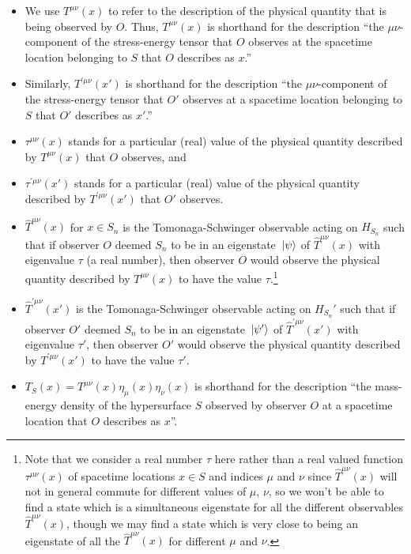 \begin{itemize}
\item We use $T^{\mu\nu}(x)$ to refer to the description of the physical quantity that is being observed by $O$. Thus, $T^{\mu\nu}(x)$ is shorthand for the description ``the $\mu\nu$-component of the stress-energy tensor that $O$ observes at the spacetime location belonging to $S$ that $O$ describes as  $x$.'' 
\item Similarly,  $T^{\prime\mu\nu}(x')$ is shorthand for the description ``the $\mu\nu$-component of the stress-energy tensor that $O'$ observes at a spacetime location  belonging to $S$ that $O'$ describes as $x'$.'' 
\item $\tau^{\mu\nu}(x)$ stands for a particular (real) value of the physical quantity described by $T^{\mu\nu}(x)$ that $O$ observes, and 
\item $\tau^{\prime\mu\nu}(x')$ stands for a particular (real) value of the physical quantity described by $T^{\prime\mu\nu}(x')$ that $O'$ observes.
\item $\hat{T}^{\mu\nu}(x)$ for $x\in S_n$ is the Tomonaga-Schwinger observable acting on $H_{S_n}$ such that if observer $O$ deemed $S_n$ to be in an eigenstate $\ket*{\psi}$ of $\hat{T}^{\mu\nu}(x)$ with eigenvalue $\tau$ (a real number), then observer $O$ would observe the physical quantity described by  $T^{\mu\nu}(x)$ to have the value $\tau$.\footnote{Note that we consider a real number $\tau$ here rather than a real valued function $\tau^{\mu\nu}(x)$ of spacetime locations $x\in S$ and indices $\mu$ and $\nu$ since $\hat{T}^{\mu\nu}(x)$ will not in general commute for different values of $\mu$, $\nu$, so we won't be able to find a state which is a simultaneous eigenstate for all the different observables $\hat{T}^{\mu\nu}(x)$, though we may find a state which is very close to being an eigenstate of all the  $\hat{T}^{\mu\nu}(x)$ for different $\mu$ and $\nu$.} 
\item $\hat{T}^{\prime\mu\nu}(x')$ is the Tomonaga-Schwinger observable acting on $H_{S_n}'$ such that if observer $O'$ deemed $S_n$ to be in an eigenstate $\ket*{\psi'}$ of  $\hat{T}^{\prime\mu\nu}(x')$ with eigenvalue $\tau'$, then observer $O'$ would observe the physical quantity described by  $T^{\prime\mu\nu}(x')$ to have the value $\tau'$. 
\item $T_S(x)={T}^{\mu\nu}(x)\eta_{\mu}(x)\eta_{\nu}(x)$ is shorthand for the description ``the mass-energy density of the hypersurface $S$ observed by observer $O$ at a spacetime location that $O$ describes as $x$''. 

\end{itemize}
